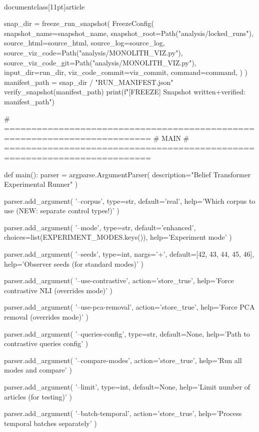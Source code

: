 \\documentclass[11pt]{article}
\begin{document}
\begin{CodeBlock}
    snap_dir = freeze_run_snapshot(
        FreezeConfig(
            snapshot_name=snapshot_name,
            snapshot_root=Path("analysis/locked_runs"),
            source_html=source_html,
            source_log=source_log,
            source_viz_code=Path("analysis/MONOLITH_VIZ.py"),
            source_viz_code_git=Path("analysis/MONOLITH_VIZ.py"),
            input_dir=run_dir,
            viz_code_commit=viz_commit,
            command=command,
        )
    )
    manifest_path = snap_dir / "RUN_MANIFEST.json"
    verify_snapshot(manifest_path)
    print(f"[FREEZE] Snapshot written+verified: {manifest_path}")


# =========================================================================
# MAIN
# =========================================================================

def main():
    parser = argparse.ArgumentParser(
        description="Belief Transformer Experimental Runner"
    )
    
    parser.add_argument(
        '--corpus',
        type=str,
        default='real',
        help='Which corpus to use (NEW: separate control types!)'
    )
    
    parser.add_argument(
        '--mode',
        type=str,
        default='enhanced',
        choices=list(EXPERIMENT_MODES.keys()),
        help='Experiment mode'
    )
    
    parser.add_argument(
        '--seeds',
        type=int,
        nargs='+',
        default=[42, 43, 44, 45, 46],
        help='Observer seeds (for standard modes)'
    )
    
    parser.add_argument(
        '--use-contrastive',
        action='store_true',
        help='Force contrastive NLI (overrides mode)'
    )
    
    parser.add_argument(
        '--use-pca-removal',
        action='store_true',
        help='Force PCA removal (overrides mode)'
    )
    
    parser.add_argument(
        '--queries-config',
        type=str,
        default=None,
        help='Path to contrastive queries config'
    )
    
    parser.add_argument(
        '--compare-modes',
        action='store_true',
        help='Run all modes and compare'
    )
    
    parser.add_argument(
        '--limit',
        type=int,
        default=None,
        help='Limit number of articles (for testing)'
    )
    
    parser.add_argument(
        '--batch-temporal',
        action='store_true',
        help='Process temporal batches separately'
    )
    

\end{CodeBlock}
\end{document}
